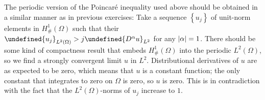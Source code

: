 \documentclass[11pt,leqno]{article}
\theoremstyle{plain}
\theoremstyle{definition}
\numberwithin{equation}{section}
\numberwithin{lem}{section}
\newcommand{\cbr}[1]{\left\{#1\right\}}
\let\norm\undefined %
\DeclarePairedDelimiter\norm{\lVert}{\rVert}
\begin{document}
\begin{enumerate}
\begin{enumerate}
        The periodic version of the Poincar\'e inequality used above should be obtained in a similar manner as in previous exercises: Take a sequence $\cbr{u_j}$ of unit-norm elements in $H^1_\#(\Omega)$ such that their $\norm{u_j}_{L^2(\Omega)}>j\norm{D^\alpha u}_{L^2}$ for any $\abs{\alpha} = 1$. There should be some kind of compactness result that embeds $H^1_\#(\Omega)$ into the periodic $L^2(\Omega)$, so we find a strongly convergent limit $u$ in $L^2$. Distributional derivatives of $u$ are as expected to be zero, which means that $u$ is a constant function; the only constant that integrates to zero on $\Omega$ is zero, so $u$ is zero. This is in contradiction with the fact that the $L^2(\Omega)$-norms of $u_j$ increase to $1$.
    \end{enumerate}
\end{enumerate}
\end{document}
